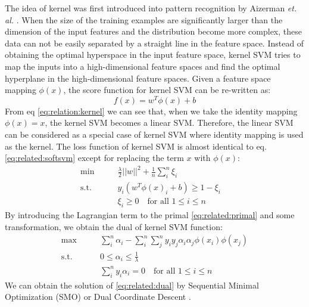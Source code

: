 The idea of kernel was first introduced into pattern recognition by Aizerman \textit{et. al.} \cite{aizerman1964probability}. When the size of the training examples are significantly larger than the dimension of the input features and the distribution become more complex, these data can not be easily separated by a straight line in the feature space.
Instead of obtaining the optimal hyperspace in the input feature space, kernel SVM tries to map the inputs into a high-dimensional feature spaces and find the optimal hyperplane in the high-dimensional feature spaces. Given a feature space mapping $\phi(x)$, the score function for kernel SVM can be re-written as:
\begin{equation}\label{eq:relation:kernel}
f(x) = w^T\phi(x)+b
\end{equation}
From eq \eqref{eq:relation:kernel} we can see that, when we take the identity mapping $\phi(x) = x$, the kernel SVM becomes a linear SVM. Therefore, the linear SVM can be considered as a special case of kernel SVM where identity mapping is used as the kernel. The loss function of kernel SVM is almost identical to eq. \eqref{eq:related:softsvm} except for replacing the term $x$ with $\phi(x)$: 
\begin{equation}\label{eq:related:primal}
\begin{aligned}
\min \qquad &  \frac{\lambda}{2}||w||^2+\frac{1}{n}\sum_{i}^{n}\xi_i\\
\text{s.t.}\qquad & y_i(w^T\phi(x)_i+b) \geq 1-\xi_i \quad \\
& \xi_i \geq 0     \quad \text{for all } 1\leq i \leq n
\end{aligned}
\end{equation}
By introducing the Lagrangian term to the primal \eqref{eq:related:primal} and some transformation, we obtain the dual of kernel SVM function:
\begin{equation} \label{eq:related:dual}
\begin{aligned}
\max \qquad& \sum_{i}^{n}\alpha_i-\sum\limits_i^n {\sum\limits_j^n {{y_i}{y_j}{\alpha _i}} } {\alpha _j}\phi ({x_i})\phi ({x_j})\\
\text{s.t.} \qquad & 0 \leq \alpha_i \leq \frac{1}{\lambda}\\
& \sum_{i}^{n}y_i\alpha_i=0 \quad \text{for all } 1\leq i \leq n
\end{aligned}
\end{equation}
We can obtain the solution of \eqref{eq:related:dual} by Sequential Minimal Optimization (SMO) \cite{platt1998sequential} or Dual Coordinate Descent \cite{hsieh2008dual}.

